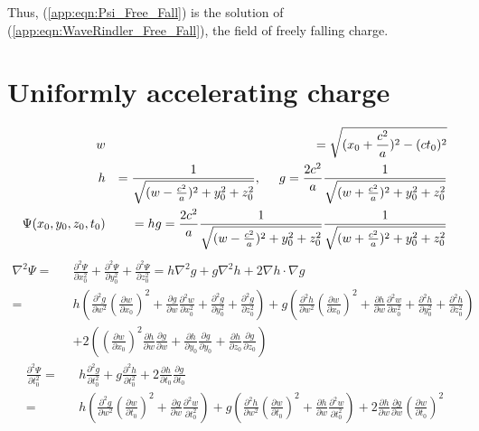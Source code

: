 \documentclass[prd,showpacs,preprint]{revtex4}
\begin{document}
\begin{appendix}
Thus, (\ref{app:eqn:Psi_Free_Fall}) is the solution of (\ref{app:eqn:WaveRindler_Free_Fall}), the field of freely falling charge.

\section{Uniformly accelerating charge\label{app:Psi_Accelerating}}
\begin{eqnarray}
w&&=\sqrt{(x_0+\frac{c^2}{a})^2-(ct_0)^2}\nonumber\\
h&&=\frac{1}{\sqrt{(w-\frac{c^2}{a})^2 + y_0^2 + z_0^2}},\hspace{5mm}
g=\frac{2c^2}{a}\frac{1}{\sqrt{(w+\frac{c^2}{a})^2+y_0^2+z_0^2}}\nonumber\\
\Psi(x_0,y_0,z_0,t_0)&&=hg=\frac{2c^2}{a}\frac{1}{\sqrt{(w-\frac{c^2}{a})^2 + y_0^2 + z_0^2}}
\frac{1}{\sqrt{(w+\frac{c^2}{a})^2+y_0^2+z_0^2}}
\end{eqnarray}
\begin{eqnarray}
\nabla^2\Psi=&&\frac{\partial^2 \Psi}{\partial x_0^2}+\frac{\partial^2 \Psi}{\partial y_0^2}+\frac{\partial^2 \Psi}{\partial z_0^2} = h\nabla^2 g + g\nabla^2 h + 2\nabla h\cdot\nabla g\nonumber\\
=&&h(\frac{\partial^2g}{\partial w^2}(\frac{\partial w}{\partial x_0})^2+\frac{\partial g}{\partial w}\frac{\partial^2 w}{\partial x_0^2}+\frac{\partial^2 g}{\partial y_0^2}+\frac{\partial^2 g}{\partial z_0^2}) + g(\frac{\partial^2h}{\partial w^2}(\frac{\partial w}{\partial x_0})^2+\frac{\partial h}{\partial w}\frac{\partial^2 w}{\partial x_0^2}+\frac{\partial^2 h}{\partial y_0^2}+\frac{\partial^2 h}{\partial z_0^2})\nonumber\\
&&+ 2((\frac{\partial w}{\partial x_0})^2\frac{\partial h}{\partial w}\frac{\partial g}{\partial w}+\frac{\partial h}{\partial y_0}\frac{\partial g}{\partial y_0}+\frac{\partial h}{\partial z_0}\frac{\partial g}{\partial z_0})
\end{eqnarray}
\begin{eqnarray}
\frac{\partial^2\Psi}{\partial t_0^2}=&&h\frac{\partial^2 g}{\partial t_0^2}+g\frac{\partial^2 h}{\partial t_0^2}+2\frac{\partial h}{\partial t_0}\frac{\partial g}{\partial t_0}\nonumber\\
=&&h(\frac{\partial^2 g}{\partial w^2}(\frac{\partial w}{\partial t_0})^2+\frac{\partial g}{\partial w}\frac{\partial^2 w}{\partial t_0^2}) + g(\frac{\partial^2 h}{\partial w^2}(\frac{\partial w}{\partial t_0})^2+\frac{\partial h}{\partial w}\frac{\partial^2 w}{\partial t_0^2})+2\frac{\partial h}{\partial w}\frac{\partial g}{\partial w}(\frac{\partial w}{\partial t_0})^2

\end{eqnarray}
\end{appendix}
\end{document}

